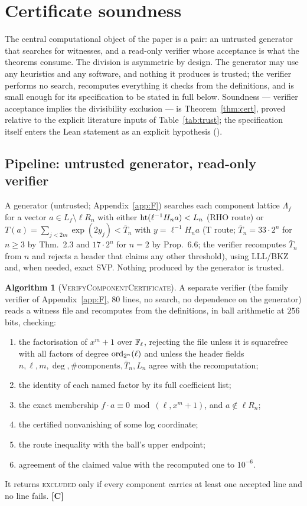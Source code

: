 \documentclass[11pt]{amsart}
\theoremstyle{remark}\newtheorem{remark}[theorem]{Remark}
\theoremstyle{definition}\newtheorem{definition}[theorem]{Definition}
\theoremstyle{definition}\newtheorem{algorithm}[theorem]{Algorithm}
\newcommand{\lbl}[1]{\textbf{[#1]}}\newcommand{\barT}{\bar T_n}
\begin{document}
\section{Certificate soundness}\label{sec:cert}
The central computational object of the paper is a pair: an untrusted generator that searches for witnesses, and a read-only verifier whose acceptance is what the theorems consume. The division is asymmetric by design. The generator may use any heuristics and any software, and nothing it produces is trusted; the verifier performs no search, recomputes everything it checks from the definitions, and is small enough for its specification to be stated in full below. Soundness --- verifier acceptance implies the divisibility exclusion --- is Theorem~\ref{thm:cert}, proved relative to the explicit literature inputs of Table~\ref{tab:trust}; the specification itself enters the Lean statement as an explicit hypothesis ().
\subsection{Pipeline: untrusted generator, read-only verifier}
A generator (untrusted; Appendix~\ref{app:F}) searches each component lattice $\Lambda_f$ for a vector $a\in L_f\setminus\ell R_n$ with either $\operatorname{ht}(\ell^{-1}H_na)<L_n$ (RHO route) or $T(a)=\sum_{j<2m}\exp(2y_j)<\barT$ with $y=\ell^{-1}H_na$ (T route; $\barT=33\cdot2^n$ for $n\ge3$ by \cite{KY} Thm.~2.3 and $17\cdot2^n$ for $n=2$ by \cite{MO3} Prop.~6.6; the verifier recomputes $\barT$ from $n$ and rejects a header that claims any other threshold), using LLL/BKZ and, when needed, exact SVP. Nothing produced by the generator is trusted. \begin{algorithm}[\textsc{VerifyComponentCertificate}]\label{alg:verify}
A separate verifier (the family verifier of Appendix~\ref{app:F}, $80$ lines, no search, no dependence on the generator) reads a witness file and recomputes from the definitions, in ball arithmetic at $256$ bits, checking:
\begin{enumerate}
\item[(V1)] the factorisation of $x^m+1$ over $\mathbb{F}_\ell$, rejecting the file unless it is squarefree with all factors of degree $\operatorname{ord}_{2^n}(\ell)$ and unless the header fields $n,\ell,m,\deg,\#\text{components},\barT,L_n$ agree with the recomputation;
\item[(V2)] the identity of each named factor by its full coefficient list;
\item[(V3)] the exact membership $f\cdot a\equiv0\bmod(\ell,x^m+1)$, and $a\notin\ell R_n$;
\item[(V4)] the certified nonvanishing of some log coordinate;
\item[(V5)] the route inequality with the ball's upper endpoint;
\item[(V6)] agreement of the claimed value with the recomputed one to $10^{-6}$.
\end{enumerate}
It returns \textsc{excluded} only if every component carries at least one accepted line and no line fails. \lbl{C}
\end{algorithm}
\end{document}
